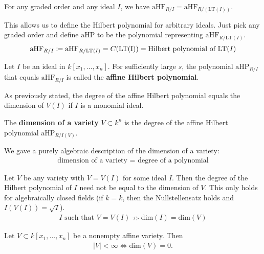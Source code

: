 \begin{prop}
  For any graded order and any ideal \( I \), we have \( \mathrm{aHF}_{R / I} = \mathrm{aHF}_{R / (\mathrm{LT}(I))} \).
\end{prop}

This allows us to define the Hilbert polynomial  for arbitrary ideals. Just pick any graded order and define \( \mathrm{aHP} \) to be the polynomial representing \( \mathrm{aHF}_{R / \mathrm{LT}(I)} \).
\begin{align*}
  \mathrm{aHF}_{R / I} \coloneqq \mathrm{aHF}_{R / \mathrm{LT}(I)} = C(\mathrm{LT(I)}) = \text{Hilbert polynomial of \( \mathrm{LT}(I) \)}
\end{align*}

\begin{defi}
  Let \( I \) be an ideal in \( k[x_1,...,x_n] \). For sufficiently large \( s \), the polynomial \( \mathrm{aHP}_{R / I} \) that equals \( \mathrm{aHF}_{R / I} \) is called the \textbf{affine Hilbert polynomial}.
\end{defi}

As previously stated, the degree of the affine Hilbert polynomial equals the dimension of \( V(I) \) if \( I \) is a monomial ideal. 

\begin{defi}
  The \textbf{dimension of a variety} \( V \subset k^n \) is the degree of the affine Hilbert polynomial \( \mathrm{aHP}_{R / I(V)} \).
\end{defi}

We gave a purely algebraic description of the dimension of a variety:
\begin{align*}
  \text{dimension of a variety } = \text{ degree of a polynomial}
\end{align*}

\begin{remark}[Warning]
  Let \( V \) be any variety with \( V = V(I) \) for some ideal \( I \). Then the degree of the Hilbert polynomial of \( I \) need not be equal to the dimension of \( V \). This only holds for algebraically closed fields (if \( k = \bar k \), then the Nullstellensatz holds and \( I(V(I)) = \sqrt I \)).
  \begin{align*}
    I \text{ such that } V = V(I) \nRightarrow \mathrm{dim}(I) = \mathrm{dim}(V)
  \end{align*}
\end{remark}

\begin{prop}
  Let \( V \subset k[x_1,...,x_n] \) be a nonempty affine variety. Then 
  \begin{align*}
    |V| < \infty \iff \mathrm{dim}(V) = 0 .
  \end{align*}
\end{prop}

